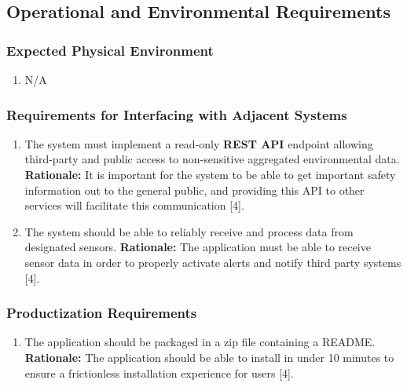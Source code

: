 \documentclass[]{article}
\begin{document}

\subsection{Operational and Environmental Requirements}
\label{sub:operational_and_environmental_requirements}

\subsubsection{Expected Physical Environment}
\label{ssub:expected_physical_environment}
\begin{enumerate}[{OE-EPE}1. ]
	\item N/A
\end{enumerate}

\subsubsection{Requirements for Interfacing with Adjacent Systems}
\label{ssub:requirements_for_interfacing_with_adjacent_systems}
\begin{enumerate}[{OE-IA}1. ]
	\item The system must implement a read-only \textbf{REST API} endpoint allowing third-party and public access to non-sensitive aggregated environmental data.\newline
	{\bf Rationale:} It is important for the system to be able to get important safety information out to the general public, and providing this API to other services will facilitate this communication [4].
	\item The system should be able to reliably receive and process data from designated sensors.\newline
	{\bf Rationale:} The application must be able to receive sensor data in order to properly activate alerts and notify third party systems [4].
\end{enumerate}

\subsubsection{Productization Requirements}
\label{ssub:productization_requirements}
\begin{enumerate}[{OE-P}1. ]
	\item The application should be packaged in a zip file containing a README.\newline
	{\bf Rationale:} {\color{red} The application should be able to install in under 10 minutes to ensure a frictionless installation experience for users [4].}
\end{enumerate}
\end{document}
